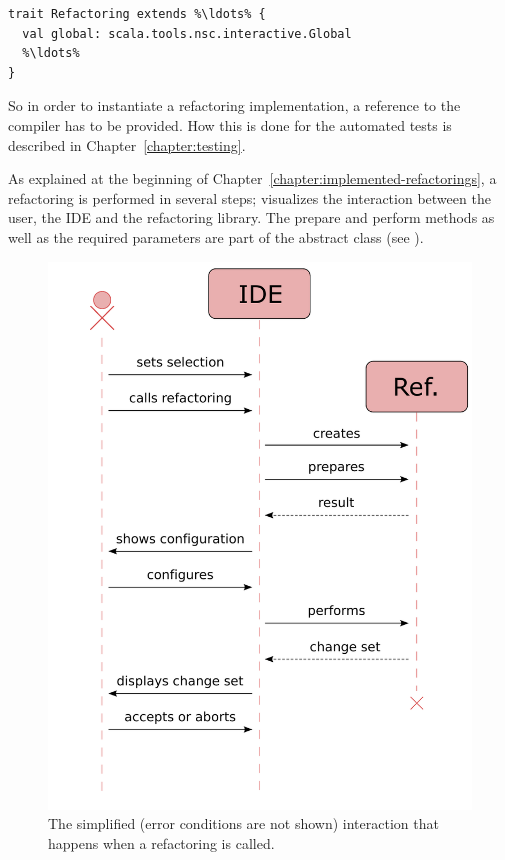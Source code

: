 \documentclass[10pt,a4paper,oneside]{scrreprt}
\begin{document}
\begin{lstlisting}
trait Refactoring extends %\ldots% {
  val global: scala.tools.nsc.interactive.Global
  %\ldots% 
}
\end{lstlisting}

So in order to instantiate a refactoring implementation, a reference to the compiler has to be provided. How this is done for the automated tests is described in Chapter~\vref{chapter:testing}.

As explained at the beginning of Chapter~\vref{chapter:implemented-refactorings}, a refactoring is performed in several steps;  visualizes the interaction between the user, the IDE and the refactoring library. The prepare and perform methods as well as the required parameters are part of the  abstract class (see ).

\begin{figure}
  \centering
  \includegraphics[width=0.9\linewidth]{refactoring-sequence.pdf}
  \caption{The simplified (error conditions are not shown) interaction that happens when a refactoring is called.}
  \label{figure:refactoring-sequence}
\end{figure}
\end{document}
